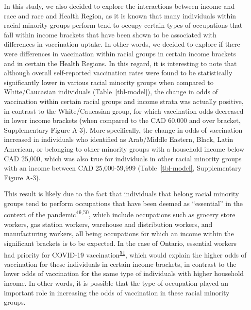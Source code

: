 \documentclass[
  letterpaper,
  DIV=11,
  numbers=noendperiod]{scrartcl}
\begin{document}
In this study, we also decided to explore the interactions between
income and race and race and Health Region, as it is known that many
individuals within racial minority groups perform tend to occupy certain
types of occupations that fall within income brackets that have been
shown to be associated with differences in vaccination uptake. In other
words, we decided to explore if there were differences in vaccination
within racial groups in certain income brackets and in certain the
Health Regions. In this regard, it is interesting to note that although
overall self-reported vaccination rates were found to be statistically
significantly lower in various racial minority groups when compared to
White/Caucasian individuals (Table~\ref{tbl-model}), the change in odds
of vaccination within certain racial groups and income strata was
actually positive, in contrast to the White/Caucasian group, for which
vaccination odds decreased in lower income brackets (when compared to
the CAD 60,000 and over bracket, Supplementary Figure A-3). More
specifically, the change in odds of vaccination increased in individuals
who identified as Arab/Middle Eastern, Black, Latin American, or
belonging to other minority groups with a household income below CAD
25,000, which was also true for individuals in other racial minority
groups with an income between CAD 25,000-59,999 (Table~\ref{tbl-model},
Supplementary Figure A-3).

This result is likely due to the fact that individuals that belong
racial minority groups tend to perform occupations that have been deemed
as ``essential'' in the context of the
pandemic\textsuperscript{\protect\hyperlink{ref-hawkins2020}{49},\protect\hyperlink{ref-ct2021}{50}},
which include occupations such as grocery store workers, gas station
workers, warehouse and distribution workers, and manufacturing workers,
all being occupations for which an income within the significant
brackets is to be expected. In the case of Ontario, essential workers
had priority for COVID-19
vaccination\textsuperscript{\protect\hyperlink{ref-mishra2021}{51}},
which would explain the higher odds of vaccination for these individuals
in certain income brackets, in contrast to the lower odds of vaccination
for the same type of individuals with higher household income. In other
words, it is possible that the type of occupation played an important
role in increasing the odds of vaccination in these racial minority
groups.
\end{document}
